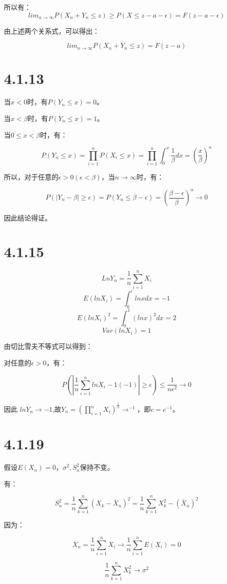 \documentclass{article}
\begin{document}
所以有：
$$lim_{n\rightarrow \infty}P(X_n+Y_n\leq z) \geq P(X\leq z-a-\epsilon)=F(z-a-\epsilon)$$

由上述两个关系式，可以得出：

$$lim_{n\rightarrow \infty}P(X_n+Y_n\leq z)=F(z-a)$$

\section{4.1.13}
当$x<0$时，有$P(Y_n \leq x)=0$。

当$x<\beta$时，有$P(Y_n \leq x)=1$。

当$0\leq x < \beta$时，有：

$$P(Y_n \leq x) = \prod^n_{i=1}P(X_i\leq x)=\prod^n_{i=1}\int^x_0\frac1\beta dx=(\frac x\beta)^n$$

所以，对于任意的$\epsilon > 0 (\epsilon < \beta)$，当$n\rightarrow \infty$时，有：

$$P(|Y_n-\beta|\geq \epsilon)=P(Y_n \leq \beta - \epsilon)=(\frac{\beta-\epsilon}{\beta})^n \rightarrow 0$$

因此结论得证。

\section{4.1.15}
$$LnY_n=\frac1n\sum^n_{i=1}X_i$$
$$E(lnX_i)=\int^i_0lnxdx=-1$$
$$E(lnX_i)^2=\int^1_0(lnx)^2dx=2$$
$$Var(lnX_i)=1$$

由切比雪夫不等式可以得到：

对任意的$\epsilon > 0$，有：

$$P(|\frac1n\sum^n_{i=1}lnX_i-1(-1)|\geq\epsilon)\leq \frac1{n\epsilon^2}\rightarrow 0$$

因此 $lnY_n\rightarrow -1$,故$Y_n=(\prod^n_{i=1}X_i)^{\frac1n}\rightarrow^{-1}$，即$c=e^{-1}$。


\section{4.1.19}
假设$E(X_n)=0$，$\sigma^2,S_n^2$保持不变。

有：

$$S_n^2=\frac1n\sum^n_{k=1}(X_k-\overline{X}_n)^2=\frac1n\sum^n_{k=1}X_k^2-(\overline{X}_n)^2$$

因为：

$$\overline{X}_n=\frac1n\sum^n_{i=1}X_i\rightarrow\frac1n\sum^n_{i=1}E(X_i)=0$$

$$\frac1n\sum^n_{k=1}X^2_k\rightarrow \sigma^2$$
\end{document}
